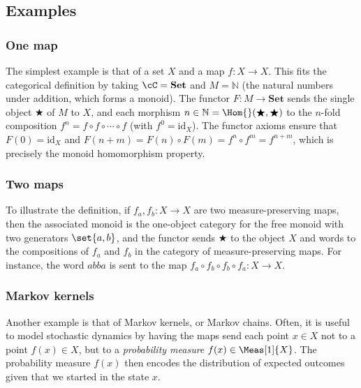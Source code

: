 \documentclass[../main]{subfiles}
\begin{document}
\subsection{Examples}

\subsubsection{One map}
The simplest example is that of a set \(X\) and a map \(f \colon X \to X\).
This fits the categorical definition by taking \(\cC = \mathbf{Set}\) and \(M = \mathbb{N}\) (the natural numbers under addition, which forms a monoid). The functor \(F \colon M \to \mathbf{Set}\) sends the single object \(\bigstar\) of \(M\) to \(X\), and each morphism \(n \in \mathbb{N} = \Hom{}(\bigstar, \bigstar)\) to the \(n\)-fold composition \(f^n = f \circ f \circ \cdots \circ f\) (with \(f^0 = \mathrm{id}_X\)). The functor axioms ensure that \(F(0) = \mathrm{id}_X\) and \(F(n + m) = F(n) \circ F(m) = f^n \circ f^m = f^{n+m}\), which is precisely the monoid homomorphism property.


\subsubsection{Two maps}
To illustrate the definition, if \(f_a,f_b \colon X \to X\) are two measure-preserving maps, then the associated monoid is the one-object category for the free monoid with two generators \(\set{a,b}\), and the functor sends \(\bigstar\) to the object \(X\) and words to the compositions of \(f_a\) and \(f_b\) in the category of measure-preserving maps. For instance, the word \(abba\) is sent to the map \(f_a \circ f_b \circ f_b \circ f_a \colon X \to X\).

\subsubsection{Markov kernels}
Another example is that of Markov kernels, or Markov chains. Often, it is useful to model stochastic dynamics by having the maps send each point \(x \in X\) not to a point \(f(x) \in X\), but to a \emph{probability measure} \(f(x) \in \Meas[1]{X}\). The probability measure \(f(x)\) then encodes the distribution of expected outcomes given that we started in the state \(x\).
\end{document}
